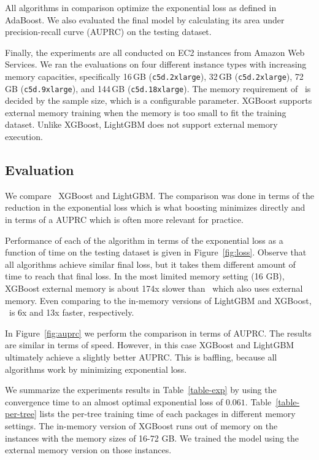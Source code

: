 All algorithms in comparison optimize the exponential loss as defined in AdaBoost.
We also evaluated the final model by calculating its area under precision-recall
curve (AUPRC) on the testing dataset.

Finally, the experiments are all conducted on EC2 instances from Amazon Web Services.
We ran the evaluations on four different instance types with increasing memory capacities,
specifically
16\,GB (\texttt{c5d.2xlarge}), 32\,GB (\texttt{c5d.2xlarge}),
72\,GB (\texttt{c5d.9xlarge}), and 144\,GB (\texttt{c5d.18xlarge}).
The memory requirement of \Sparrow\ is decided by the sample size,
which is a configurable parameter.
XGBoost supports external memory training when the memory is too small to fit the
training dataset.
Unlike XGBoost, LightGBM does not support external memory execution.


\subsection{Evaluation}

We compare \Sparrow\ XGBoost and LightGBM. The comparison was done in
terms of the reduction in the exponential loss which is what boosting
minimizes directly and in terms of a AUPRC which is often more
relevant for practice.

Performance of each of the algorithm in terms of
the exponential loss as a function of time on the testing dataset is given in
Figure~\ref{fig:loss}. Observe that all algorithms achieve similar
final loss, but it takes them different amount of time to reach that
final loss.
In the most limited memory setting (16 GB),
XGBoost external memory is about 174x
 slower than \Sparrow\ which also uses external memory.
Even comparing to the in-memory versions of LightGBM and XGBoost,
\Sparrow\ is 6x and 13x faster, respectively.

In Figure~\ref{fig:auprc} we perform the comparison in terms of
AUPRC. The results are similar in terms of speed. However, in this
case XGBoost and LightGBM ultimately achieve a slightly better
AUPRC. This is baffling, because all algorithms work by minimizing
exponential loss.

We summarize the experiments results in Table~\ref{table-exp} by
using the convergence time to an almost optimal exponential loss of $0.061$.
Table~\ref{table-per-tree} lists the per-tree training time of each packages
in different memory settings.
The in-memory version of XGBoost runs out of memory on the instances with
the memory sizes of 16-72 GB. We trained the model using the external memory
version on those instances.

